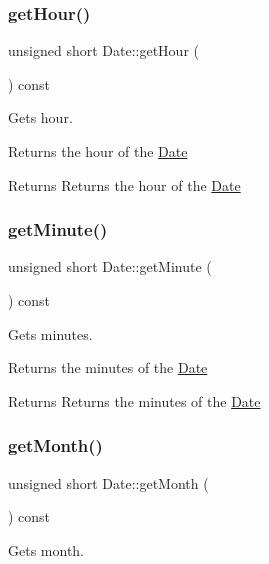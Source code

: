 \subsubsection{\texorpdfstring{get\+Hour()}{getHour()}}
{\footnotesize\ttfamily unsigned short Date\+::get\+Hour (\begin{DoxyParamCaption}{ }\end{DoxyParamCaption}) const}



Gets hour. 

Returns the hour of the \hyperlink{class_date}{Date}

\begin{DoxyReturn}{Returns}
Returns the hour of the \hyperlink{class_date}{Date} 
\end{DoxyReturn}
\mbox{\label{class_date_aa4d5c4e15ec04ff5fa18755d76acefe0}} 
\subsubsection{\texorpdfstring{get\+Minute()}{getMinute()}}
{\footnotesize\ttfamily unsigned short Date\+::get\+Minute (\begin{DoxyParamCaption}{ }\end{DoxyParamCaption}) const}



Gets minutes. 

Returns the minutes of the \hyperlink{class_date}{Date}

\begin{DoxyReturn}{Returns}
Returns the minutes of the \hyperlink{class_date}{Date} 
\end{DoxyReturn}
\mbox{\label{class_date_ad077bd6ae19462875a8bd10aed9a6233}} 
\subsubsection{\texorpdfstring{get\+Month()}{getMonth()}}
{\footnotesize\ttfamily unsigned short Date\+::get\+Month (\begin{DoxyParamCaption}{ }\end{DoxyParamCaption}) const}



Gets month. 

